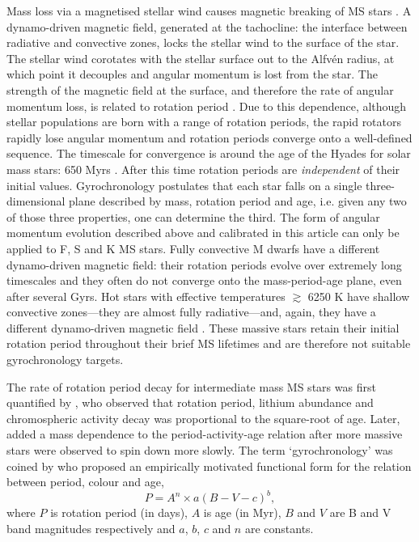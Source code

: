 \documentclass[11pt,preprint]{aastex}
\begin{document}
Mass loss via a magnetised stellar wind causes magnetic breaking of MS stars \citep{Weber1967}.
A dynamo-driven magnetic field, generated at the tachocline: the interface between radiative and convective zones, locks the stellar wind to the surface of the star.
The stellar wind corotates with the stellar surface out to the Alfv\'{e}n radius, at which point it decouples and angular momentum is lost from the star.
The strength of the magnetic field at the surface, and therefore the rate of angular momentum loss, is related to rotation period \citep{Kawaler1988}.
Due to this dependence, although stellar populations are born with a range of rotation periods, the rapid rotators rapidly lose angular momentum and rotation periods converge onto a well-defined sequence.
The timescale for convergence is around the age of the Hyades for solar mass stars: 650 Myrs \citep{Radick1987, Irwin2009}.
After this time rotation periods are \emph{independent} of their initial values.
Gyrochronology postulates that each star falls on a single three-dimensional plane described by mass, rotation period and age, i.e. given any two of those three properties, one can determine the third.
The form of angular momentum evolution described above and calibrated in this article can only be applied to F, S and K MS stars.
Fully convective M dwarfs have a different dynamo-driven magnetic field: their rotation periods evolve over extremely long timescales and they often do not converge onto the mass-period-age plane, even after several Gyrs.
Hot stars with effective temperatures $\gtrsim$ 6250 K have shallow convective zones---they are almost fully radiative---and, again, they have a different dynamo-driven magnetic field \citep{Kraft1967}.
These massive stars retain their initial rotation period throughout their brief MS lifetimes and are therefore not suitable gyrochronology targets.

The rate of rotation period decay for intermediate mass MS stars was first quantified by \citet{Skumanich1972}, who observed that rotation period, lithium abundance and chromospheric activity decay was proportional to the square-root of age.
Later, \citet{Noyes1984_2} added a mass dependence to the period-activity-age relation after more massive stars were observed to spin down more slowly.
The term `gyrochronology' was coined by \citet{Barnes2003} who proposed an empirically motivated functional form for the relation between period, colour and age,
\begin{equation}
\label{eq:Barnes2007_2}
P = A^n \times a(B-V-c)^b,
\end{equation}
where $P$ is rotation period (in days), $A$ is age (in Myr), $B$ and $V$ are B and V band magnitudes respectively and $a$, $b$, $c$ and $n$ are constants.
\end{document}
